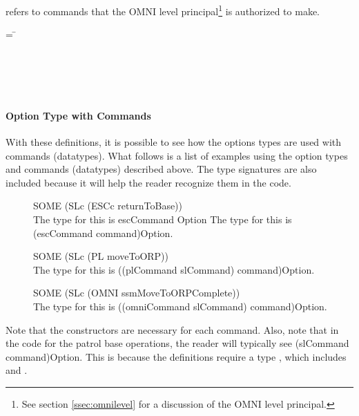 \documentclass[../../main/main.tex]{subfiles}
\begin{document}
 refers to commands that the OMNI level principal\footnote{See section \ref{ssec:omnilevel} for a discussion of the OMNI level principal.} is authorized to make. 

\begin{tabbing}
 = \=  \\
						 \> \HOLTokenBar{} \\
 				       	 	 \> \HOLTokenBar{}  \\
						 \> \HOLTokenBar{} \\
            					 \> \HOLTokenBar{} \\
					 	 \> \HOLTokenBar{} 
\end{tabbing}          
          
          
\paragraph*{Option Type with Commands}
With these definitions, it is possible to see how the options types are used with commands (datatypes).  What follows is a list of examples using the option types and commands (datatypes) described above.  The type signatures are also included because it will help the reader recognize them in the  code.
\begin{description}
\item[ ] SOME (SLc (ESCc returnToBase)) \\
The type for this is escCommand Option
The type for this is (escCommand command)Option.
\item[ ] SOME (SLc (PL moveToORP))  \\
The type for this is ((plCommand slCommand) command)Option.  
\item[ ] SOME (SLc (OMNI ssmMoveToORPComplete))\\
The type for this is ((omniCommand slCommand) command)Option.  
\end{description}

Note that the constructors are necessary for each command. Also, note that in the  code for the patrol base operations, the reader will typically see (slCommand command)Option.  This is because the definitions require a type , which includes   and .
\end{document}
